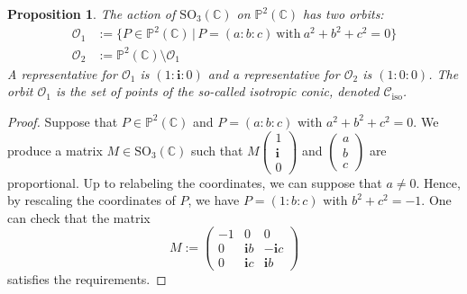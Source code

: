 \documentclass{amsart}
\theoremstyle{plain}
\newtheorem{prop}[lemma]{Proposition}
\theoremstyle{definition}
\newcommand{\C}{\mathbb{C}}
\newcommand{\p}{\mathbb{P}}
\newcommand{\iso}{\mathcal{C}_{\mathrm{iso}}}
\newcommand{\iii}{\textbf{i}}
\begin{document}
\begin{prop}
\label{two_orbits}
 The action of $\mathrm{SO}_3(\mathbb{C})$ on $\p^2(\C)$ has two orbits:
 \begin{align*}
  \mathcal{O}_1 &:=
  \bigl\{
   P \in \p^2(\C) \, | \,
   P = (a:b:c) \  \text{with} \  a^2 + b^2 + c^2 = 0
  \bigr\} \\
  \mathcal{O}_2 &:= \p^2(\C) \setminus \mathcal{O}_1
 \end{align*}
 A representative for $\mathcal{O}_1$ is $(1:\iii:0)$ and a
representative for $\mathcal{O}_2$ is $(1:0:0)$.
The orbit $\mathcal{O}_1$ is the set of points of the so-called \emph{isotropic conic}, denoted $\iso$.
\end{prop}
\begin{proof}
 Suppose that $P \in \p^2(\C)$ and $P = (a:b:c)$ with $a^2 + b^2 + c^2 = 0$.
 We produce a matrix $M \in \mathrm{SO}_3(\C)$ such that $M \left(\begin{smallmatrix} 1 \\ \iii \\ 0 \end{smallmatrix}\right)$ and $\left(\begin{smallmatrix} a \\ b \\ c \end{smallmatrix}\right)$ are proportional.
 Up to relabeling the coordinates, we can suppose that $a \neq 0$.
 Hence, by rescaling the coordinates of $P$, we have $P = (1: b: c)$ with $b^2 + c^2 = -1$.
 One can check that the matrix
 \[
  M :=
  \begin{pmatrix}
   -1 & 0 & 0 \\
   0 & \iii b & -\iii c \\
   0 & \iii c & \iii b
  \end{pmatrix}
 \]
 satisfies the requirements.


\end{proof}
\end{document}
